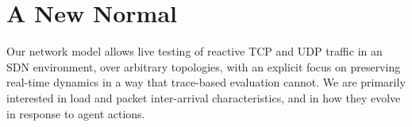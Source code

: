 \documentclass[10pt, times, conference, letterpaper]{IEEEtran}
\begin{document}
\section{A New Normal}\label{sec:a-new-normal}

%

Our network model allows live testing of reactive TCP and UDP traffic in an SDN environment, over arbitrary topologies, with an explicit focus on preserving real-time dynamics in a way that trace-based evaluation cannot.
We are primarily interested in load and packet inter-arrival characteristics, and in how they evolve in response to agent actions.



\end{document}
